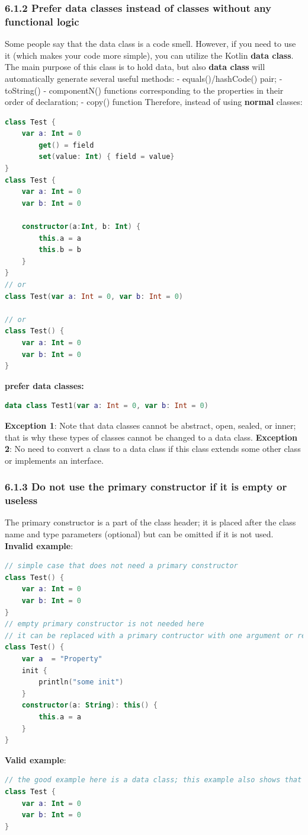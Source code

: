 \subsubsection*{\textbf{6.1.2 Prefer data classes instead of classes without any functional logic}}
\leavevmode\newline
\label{sec:6.1.2}
Some people say that the data class is a code smell. However, if you need to use it (which makes your code more simple), you can utilize the Kotlin \textbf{data class}. The main purpose of this class is to hold data,
but also \textbf{data class} will automatically generate several useful methods:
- equals()/hashCode() pair;
- toString()
- componentN() functions corresponding to the properties in their order of declaration;
- copy() function
Therefore, instead of using \textbf{normal} classes:
\begin{lstlisting}[language=Kotlin]
class Test {
    var a: Int = 0
        get() = field
        set(value: Int) { field = value}
}
class Test {
    var a: Int = 0
    var b: Int = 0
    
    constructor(a:Int, b: Int) {
        this.a = a
        this.b = b
    }
}
// or
class Test(var a: Int = 0, var b: Int = 0)
 
// or
class Test() {
    var a: Int = 0
    var b: Int = 0
}
\end{lstlisting}
\textbf{prefer data classes:}
\begin{lstlisting}[language=Kotlin]
data class Test1(var a: Int = 0, var b: Int = 0)
\end{lstlisting}
\textbf{Exception 1}: Note that data classes cannot be abstract, open, sealed, or inner; that is why these types of classes cannot be changed to a data class.
\textbf{Exception 2}: No need to convert a class to a data class if this class extends some other class or implements an interface.
\subsubsection*{\textbf{6.1.3 Do not use the primary constructor if it is empty or useless}}
\leavevmode\newline
\label{sec:6.1.3}
The primary constructor is a part of the class header; it is placed after the class name and type parameters (optional) but can be omitted if it is not used.
\textbf{Invalid example}:
\begin{lstlisting}[language=Kotlin]
// simple case that does not need a primary constructor
class Test() {
    var a: Int = 0
    var b: Int = 0
}
// empty primary constructor is not needed here
// it can be replaced with a primary contructor with one argument or removed
class Test() {
    var a  = "Property"
    init {
        println("some init")
    }
    constructor(a: String): this() {
        this.a = a
    }
}
\end{lstlisting}
\textbf{Valid example}:
\begin{lstlisting}[language=Kotlin]
// the good example here is a data class; this example also shows that you should get rid of braces for the primary constructor
class Test {
    var a: Int = 0
    var b: Int = 0
}
\end{lstlisting}
